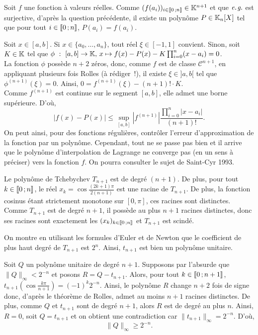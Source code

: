 \begin{solution}

\item Soit $f$ une fonction à valeurs réelles. Comme $(f(a_i))_{i\in\llbracket 0\,; n \rrbracket} \in \mathbb{K}^{n+1}$ et que $\textit{e.\nobreak\hspace{1pt}{}g.}$ est surjective, d'après la question précédente, il existe un polynôme $P \in \mathbb{K}_n[X]$ tel que pour tout $i \in \llbracket 0\,; n \rrbracket$, $P(a_i) = f(a_i)$.

\item Soit $x \in [a,b]$. Si $x \in \{a_0,\ldots,a_n\}$, tout réel $\xi \in [-1, 1]$ convient. Sinon, soit $K \in \mathbb{K}$ tel que $\phi~:~[a,b] \to \mathbb{K},\, x \mapsto f(x) - P(x) - K \prod_{i=0}^n (x - a_i) = 0$.\\
La fonction $\phi$ possède $n+2$ zéros, donc, comme $f$ est de classe $\mathscr{C}^{n+1}$, en appliquant plusieurs fois Rolles (à rédiger~!), il existe $\xi \in ]a,b[$ tel que $\phi^{(n+1)}(\xi) = 0$. Ainsi, $0 = f^{(n+1)}(\xi) - (n+1)! \cdot K$.\\
Comme $f^{(n+1)}$ est continue sur le segment $[a,b]$, elle admet une borne supérieure. D'où,
\[
|f(x) - P(x)| \leq \sup_{[a,b]} |f^{(n+1)}| \frac{\prod_{i=0}^n |x-a_i|}{(n+1)!}.
\]
{
On peut ainsi, pour des fonctions régulières, contrôler l'erreur d'approximation de la fonction par un polynôme. Cependant, tout ne se passe pas bien et il arrive que le polynôme d'interpolation de Lagrange { ne converge pas} (en un sens à préciser) vers la fonction $f$. On pourra consulter le sujet de Saint-Cyr 1993.
}

\item Le polynôme de Tchebychev $T_{n+1}$ est de degré $(n+1)$. De plus, pour tout $k \in \llbracket 0\,; n \rrbracket$, le réel $x_k = \cos \frac{(2k+1)\pi}{2(n+1)}$ est une racine de $T_{n+1}$. De plus, la fonction cosinus étant strictement monotone sur $[0,\pi]$, ces racines sont distinctes. Comme $T_{n+1}$ est de degré $n+1$, il possède au plus $n+1$ racines distinctes, donc ses racines sont exactement les $(x_k)_{k\in\llbracket 0\,; n \rrbracket}$ et $T_{n+1}$ est scindé.

\item On montre en utilisant les formules d'Euler et de Newton que le coefficient de plus haut degré de $T_{n+1}$ est $2^n$. Ainsi, $t_{n+1}$ est bien un polynôme unitaire.

\item Soit $Q$ un polynôme unitaire de degré $n+1$. Supposons par l'absurde que $\|Q\|_\infty < 2^{-n}$ et posons $R = Q - t_{n+1}$. Alors, pour tout $k \in \llbracket 0\,; n+1 \rrbracket$, $t_{n+1}(\cos \frac{k\pi}{n+1}) = (-1)^k 2^{-n}$. Ainsi, le polynôme $R$ change $n+2$ fois de signe donc, d'après le théorème de Rolles, admet au moins $n+1$ racines distinctes. De plus, comme $Q$ et $t_{n+1}$ sont de degré $n+1$, alors $R$ est de degré au plus $n$. Ainsi, $R = 0$, soit $Q = t_{n+1}$ et on obtient une contradiction car $\|t_{n+1}\|_\infty = 2^{-n}$. D'où,
{
\[\|Q\|_\infty \geq 2^{-n}.\]
}


\end{solution}
